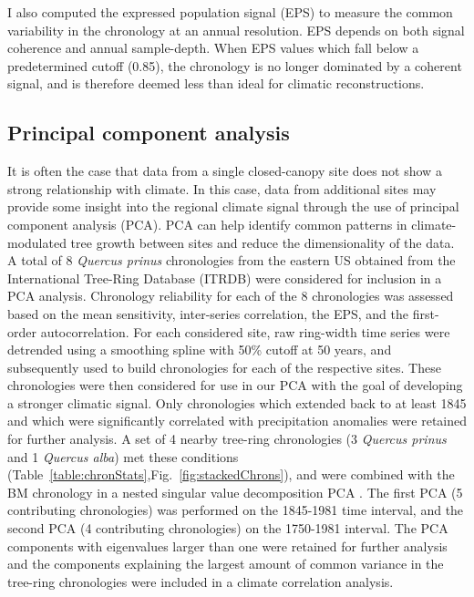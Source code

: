 I also computed the expressed population signal (EPS)\label{sym:EPS} to measure the common variability in the chronology at an annual resolution. EPS depends on both signal coherence and annual sample-depth. When EPS values which fall below a predetermined cutoff (0.85), the chronology is no longer dominated by a coherent signal, and is therefore deemed less than ideal for climatic reconstructions. 


\subsection{Principal component analysis}

It is often the case that data from a single closed-canopy site does not show a strong relationship with climate. In this case, data from additional sites may provide some insight into the regional climate signal through the use of principal component analysis (PCA). PCA can help identify common patterns in climate-modulated tree growth between sites and reduce the dimensionality of the data. A total of 8 \textit{Quercus prinus} chronologies from the eastern US obtained from the International Tree-Ring Database (ITRDB) were considered for inclusion in a PCA analysis. Chronology reliability for each of the 8 chronologies was assessed based on the mean sensitivity, inter-series correlation, the EPS, and the first-order autocorrelation.
For each considered site, raw ring-width time series were detrended using a smoothing spline with 50\% cutoff at 50 years, and subsequently used to build chronologies for each of the respective sites. These chronologies were then considered for use in our PCA with the goal of developing a stronger climatic signal. Only chronologies which extended back to at least 1845 and which were significantly correlated with precipitation anomalies were retained for further analysis. A set of 4 nearby tree-ring chronologies (3 \textit{Quercus prinus} and 1 \textit{Quercus alba}) met these conditions (Table~\ref{table:chronStats},Fig.~\ref{fig:stackedChrons}), and were combined with the BM chronology in a nested singular value decomposition PCA \cite{wold1987principal}. The first PCA (5 contributing chronologies) was performed on the 1845-1981 time interval, and the second PCA (4 contributing chronologies) on the 1750-1981 interval. The PCA components with eigenvalues larger than one were retained for further analysis and the components explaining the largest amount of common variance in the tree-ring chronologies were included in a climate correlation analysis.

